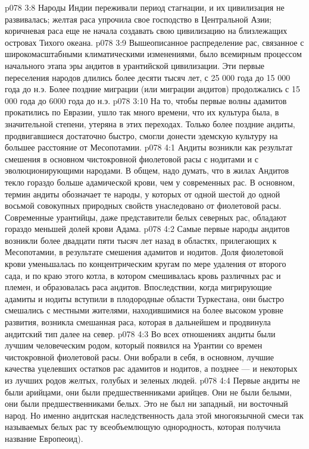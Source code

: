 \vs p078 3:8 Народы Индии переживали период стагнации, и их цивилизация не развивалась; желтая раса упрочила свое господство в Центральной Азии; коричневая раса еще не начала создавать свою цивилизацию на близлежащих островах Тихого океана.
\vs p078 3:9 \pc Вышеописанное распределение рас, связанное с широкомасштабными климатическими изменениями, было всемирным процессом начального этапа эры андитов в урантийской цивилизации. Эти первые переселения народов длились более десяти тысяч лет, с 25 000 года до 15 000 года до н.э. Более поздние миграции (или миграции андитов) продолжались с 15 000 года до 6000 года до н.э.
\vs p078 3:10 На то, чтобы первые волны адамитов прокатились по Евразии, ушло так много времени, что их культура была, в значительной степени, утеряна в этих переходах. Только более поздние андиты, продвигавшиеся достаточно быстро, смогли донести эдемскую культуру на большее расстояние от Месопотамии.
\vs p078 4:1 Андиты возникли как результат смешения в основном чистокровной фиолетовой расы с нодитами и с эволюционирующими народами. В общем, надо думать, что в жилах Андитов текло гораздо больше адамической крови, чем у современных рас. В основном, термин андиты обозначает те народы, у которых от одной шестой до одной восьмой совокупных природных свойств унаследовано от фиолетовой расы. Современные урантийцы, даже представители белых северных рас, обладают гораздо меньшей долей крови Адама.
\vs p078 4:2 Самые первые народы андитов возникли более двадцати пяти тысяч лет назад в областях, прилегающих к Месопотамии, в результате смешения адамитов и нодитов. Доля фиолетовой крови уменьшалась по концентрическим кругам по мере удаления от второго сада, и по краю этого котла, в котором смешивалась кровь различных рас и племен, и образовалась раса андитов. Впоследствии, когда мигрирующие адамиты и нодиты вступили в плодородные области Туркестана, они быстро смешались с местными жителями, находившимися на более высоком уровне развития, возникла смешанная раса, которая в дальнейшем и продвинула андитский тип далее на север.
\vs p078 4:3 Во всех отношениях андиты были лучшим человеческим родом, который появился на Урантии со времен чистокровной фиолетовой расы. Они вобрали в себя, в основном, лучшие качества уцелевших остатков рас адамитов и нодитов, а позднее --- и некоторых из лучших родов желтых, голубых и зеленых людей.
\vs p078 4:4 \pc Первые андиты не были арийцами, они были предшественниками арийцев. Они не были белыми, они были предшественниками белых. Это не был ни западный, ни восточный народ. Но именно андитская наследственность дала этой многоязычной смеси так называемых белых рас ту всеобъемлющую однородность, которая получила название Европеоид).
